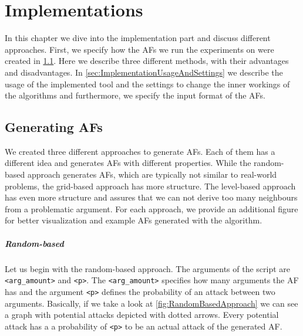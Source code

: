 \chapter{Implementations}
In this chapter we dive into the implementation part and discuss different approaches. First, we specify how the AFs we run the experiments on were created in \cref{sec:ImplementationsCreatingAFs}. Here we describe three different methods, with their advantages and disadvantages. In \cref{sec:ImplementationUsageAndSettings} we describe the usage of the implemented tool and the settings to change the inner workings of the algorithms and furthermore, we specify the input format of the AFs.

\section{Generating AFs}
\label{sec:ImplementationsCreatingAFs}
We created three different approaches to generate AFs. Each of them has a different idea and generates AFs with different properties. While the random-based approach generates AFs, which are typically not similar to real-world problems, the grid-based approach has more structure. The level-based approach has even more structure and assures that we can not derive too many neighbours from a problematic argument. For each approach, we provide an additional figure for better visualization and example AFs generated with the algorithm.

\paragraph{Random-based} Let us begin with the random-based approach. The arguments of the script are \texttt{<arg\_amount>} and \texttt{<p>}. The \texttt{<arg\_amount>} specifies how many arguments the AF has and the argument \texttt{<p>} defines the probability of an attack between two arguments. Basically, if we take a look at \cref{fig:RandomBasedApproach} we can see a graph with potential attacks depicted with dotted arrows. Every potential attack has a a probability of \texttt{<p>} to be an actual attack of the generated AF.


